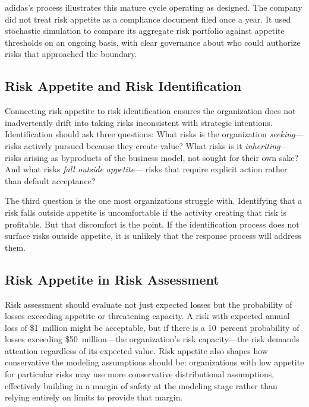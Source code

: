 \documentclass[11pt,openany]{book}
\begin{document}
adidas's process illustrates this mature cycle operating as designed. The
company did not treat risk appetite as a compliance document filed once a year.
It used stochastic simulation to compare its aggregate risk portfolio against
appetite thresholds on an ongoing basis, with clear governance about who could
authorize risks that approached the boundary.

\subsection{Risk Appetite and Risk Identification}
\label{subsec:appetite-identification}

Connecting risk appetite to risk identification ensures the organization does not
inadvertently drift into taking risks inconsistent with strategic intentions.
Identification should ask three questions: What risks is the organization
\emph{seeking}---risks actively pursued because they create value? What risks
is it \emph{inheriting}---risks arising as byproducts of the business model,
not sought for their own sake? And what risks \emph{fall outside appetite}---
risks that require explicit action rather than default acceptance?

The third question is the one most organizations struggle with. Identifying that
a risk falls outside appetite is uncomfortable if the activity creating that
risk is profitable. But that discomfort is the point. If the identification
process does not surface risks outside appetite, it is unlikely that the
response process will address them.

\subsection{Risk Appetite in Risk Assessment}
\label{subsec:appetite-assessment}

Risk assessment should evaluate not just expected losses but the probability of
losses exceeding appetite or threatening capacity. A risk with expected annual
loss of \$1~million might be acceptable, but if there is a 10~percent
probability of losses exceeding \$50~million---the organization's risk
capacity---the risk demands attention regardless of its expected value. Risk
appetite also shapes how conservative the modeling assumptions should be:
organizations with low appetite for particular risks may use more conservative
distributional assumptions, effectively building in a margin of safety at the
modeling stage rather than relying entirely on limits to provide that margin.
\end{document}
